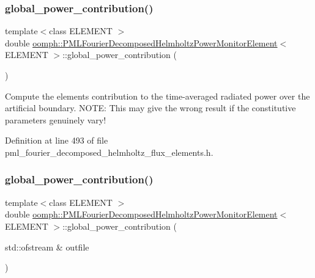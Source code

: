 \subsubsection{\texorpdfstring{global\+\_\+power\+\_\+contribution()}{global\_power\_contribution()}\hspace{0.1cm}{\footnotesize\ttfamily [1/2]}}
{\footnotesize\ttfamily template$<$class E\+L\+E\+M\+E\+NT $>$ \\
double \hyperlink{classoomph_1_1PMLFourierDecomposedHelmholtzPowerMonitorElement}{oomph\+::\+P\+M\+L\+Fourier\+Decomposed\+Helmholtz\+Power\+Monitor\+Element}$<$ E\+L\+E\+M\+E\+NT $>$\+::global\+\_\+power\+\_\+contribution (\begin{DoxyParamCaption}{ }\end{DoxyParamCaption})\hspace{0.3cm}{\ttfamily [inline]}}



Compute the element\textquotesingle{}s contribution to the time-\/averaged radiated power over the artificial boundary. N\+O\+TE\+: This may give the wrong result if the constitutive parameters genuinely vary! 



Definition at line 493 of file pml\+\_\+fourier\+\_\+decomposed\+\_\+helmholtz\+\_\+flux\+\_\+elements.\+h.

\mbox{\label{classoomph_1_1PMLFourierDecomposedHelmholtzPowerMonitorElement_a87edcf6c7adc8de31c1054e15f3d8a9b}} 
\subsubsection{\texorpdfstring{global\+\_\+power\+\_\+contribution()}{global\_power\_contribution()}\hspace{0.1cm}{\footnotesize\ttfamily [2/2]}}
{\footnotesize\ttfamily template$<$class E\+L\+E\+M\+E\+NT $>$ \\
double \hyperlink{classoomph_1_1PMLFourierDecomposedHelmholtzPowerMonitorElement}{oomph\+::\+P\+M\+L\+Fourier\+Decomposed\+Helmholtz\+Power\+Monitor\+Element}$<$ E\+L\+E\+M\+E\+NT $>$\+::global\+\_\+power\+\_\+contribution (\begin{DoxyParamCaption}\item[{std\+::ofstream \&}]{outfile }\end{DoxyParamCaption})\hspace{0.3cm}{\ttfamily [inline]}}



